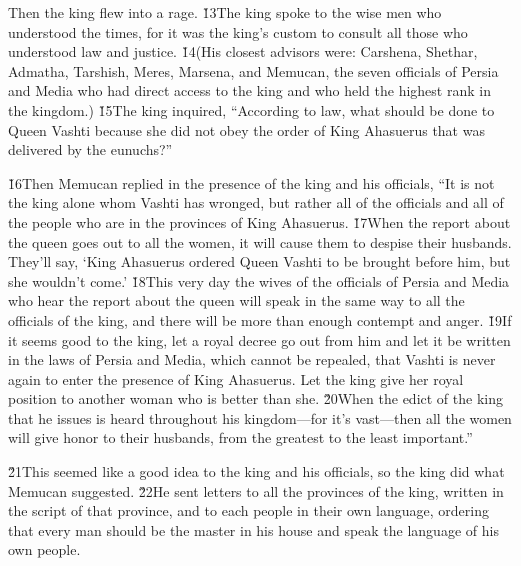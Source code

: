 Then the king flew into a rage. \v{13}The king spoke to the wise men who understood the times, for it was the king's custom to consult all those who understood law and justice. \v{14}(His closest advisors were: Carshena, Shethar, Admatha, Tarshish, Meres, Marsena, and Memucan, the seven officials of Persia and Media who had direct access to the king and who held the highest rank in the kingdom.) \v{15}The king inquired, ``According to law, what should be done to Queen Vashti because she did not obey the order of King Ahasuerus that was delivered by the eunuchs?''

\v{16}Then Memucan replied in the presence of the king and his officials, ``It is not the king alone whom Vashti has wronged, but rather all of the officials and all of the people who are in the provinces of King Ahasuerus. \v{17}When the report about the queen goes out to all the women, it will cause them to despise their husbands. They'll say, `King Ahasuerus ordered Queen Vashti to be brought before him, but she wouldn't come.' \v{18}This very day the wives of the officials of Persia and Media who hear the report about the queen will speak in the same way to all the officials of the king, and there will be more than enough contempt and anger. \v{19}If it seems good to the king, let a royal decree go out from him and let it be written in the laws of Persia and Media, which cannot be repealed, that Vashti is never again to enter the presence of King Ahasuerus. Let the king give her royal position to another woman who is better than she. \v{20}When the edict of the king that he issues is heard throughout his kingdom---for it's vast---then all the women will give honor to their husbands, from the greatest to the least important.''

\v{21}This seemed like a good idea to the king and his officials, so the king did what Memucan suggested. \v{22}He sent letters to all the provinces of the king, written in the script of that province, and to each people in their own language, ordering that every man should be the master in his house and speak the language of his own people.

